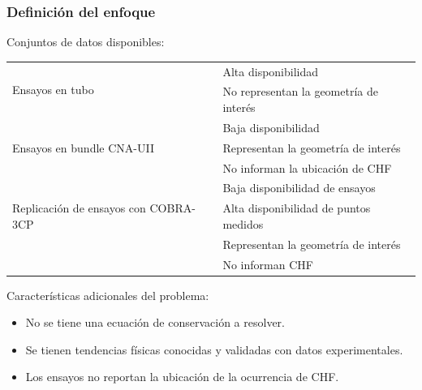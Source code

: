 \documentclass{beamer}
\begin{document}
\begin{frame}
    \frametitle{Definición del enfoque}
    Conjuntos de datos disponibles:
    \begin{table}[H]
        \centering
        \small
        \begin{tabular}{l l} 
            \multirow{2}{3.5cm}{Ensayos en tubo} & Alta disponibilidad \\
            & No representan la geometría de interés \\ \hline
            \multirow{3}{3.5cm}{Ensayos en bundle CNA-UII} & Baja disponibilidad \\
            & Representan la geometría de interés \\
            & No informan la ubicación de CHF \\ \hline
            \multirow{3}{3.5cm}{Replicación de ensayos con COBRA-3CP} & Baja disponibilidad de ensayos \\
            & Alta disponibilidad de puntos medidos \\
            & Representan la geometría de interés \\
            & No informan CHF
        \end{tabular}
    \end{table}

    Características adicionales del problema:
    \begin{itemize}
        \item No se tiene una ecuación de conservación a resolver.
        \item Se tienen tendencias físicas conocidas y validadas con datos experimentales.
        \item Los ensayos no reportan la ubicación de la ocurrencia de CHF.
    \end{itemize}
\end{frame}
\end{document}
